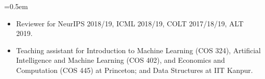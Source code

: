 \documentclass{scrartcl}
\newcommand{\Description}[1]{\hangindent=0.5em\hangafter=0\noindent\raggedright\footnotesize{#1}\par\normalsize\vspace{1em}} %
\begin{document}
\begin{cv}{}
\noindent{}

\Description{
\begin{itemize}
\item[\Forward] Reviewer for NeurIPS 2018/19, ICML 2018/19, COLT 2017/18/19, ALT 2019.
\item[\Forward] Teaching assistant for Introduction to Machine Learning (COS 324), Artificial Intelligence and Machine Learning (COS 402), and Economics and Computation
(COS 445) at Princeton; and Data Structures at IIT Kanpur.
\end{itemize}
}

\end{cv}
\end{document}
